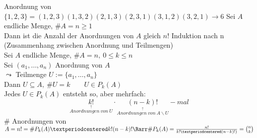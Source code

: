 \bsp
Anordnung von $\{1,2,3\}=(1,2,3)(1,3,2)(2,1,3)(2,3,1)(3,1,2)(3,2,1)→6$
%
Sei $A$ endliche Menge, $\#A=n\geq 1$\\
Dann ist die Anzahl der Anordnungen von $A$ gleich $n!$
\bew
Induktion nach n\\
%
\bem
(Zusammenhang zwischen Anordnung und Teilmengen)\\
Sei $A$ endliche Menge, $\#A=n,\ 0\leq k\leq n$\\
Sei $(a_1,…,a_n)$ Anordnung von $A$\\
$\leadsto$ Teilmenge $U:=\{a_1,…,a_n\}$\\
Dann $U\subseteq A,\ \#U=k\qquad U\in P_k(A)$\\
Jedes $U\in P_k(A)$ entsteht so, aber mehrfach:\\
\[\underset{\overset{\uparrow}{Anordnungen\ von\ U}}{k!}·\underset{\overset{\uparrow}{Anordnungen\ von\ A\backslash U}}{(n-k)!}-mal\]
$\#$ Anordnungen von $A=n!=\#P_k(A)·k!(n-k)!\Rarr\#P_k(A)=\frac{n!}{k!·(n-k)!)}=\binom{n}{k}$\\
%
